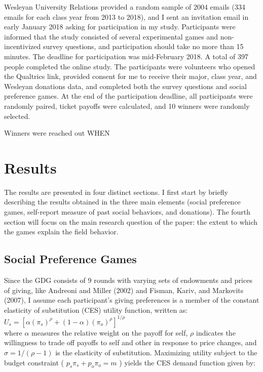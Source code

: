 \documentclass[12pt]{article}
\begin{document}
Wesleyan University Relations provided a random sample of 2004 emails (334 emails for each class year from 2013 to 2018), and I sent an invitation email in early January 2018 asking for participation in my study. Participants were informed that the study consisted of several experimental games and non-incentivized survey questions, and participation should take no more than 15 minutes.  The deadline for participation was mid-February 2018. A total of 397 people completed the online study. The participants were volunteers who opened the Qualtrics link, provided consent for me to receive their major, class year, and Wesleyan donations data, and completed both the survey questions and social preference games. At the end of the participation deadline, all participants were randomly paired, ticket payoffs were calculated, and 10 winners were randomly selected. 

{\color{red} Winners were reached out WHEN}


\section{Results}
The results are presented in four distinct sections. I first start by briefly describing the results obtained in the three main elements (social preference games, self-report measure of past social behaviors, and donations). The fourth section will focus on the main research question of the paper: the extent to which the games explain the field behavior.

\subsection{Social Preference Games}
Since the GDG consists of 9 rounds with varying sets of endowments and prices of giving, like Andreoni and Miller (2002) and Fisman, Kariv, and Markovits (2007), I assume each participant's giving preferences is a member of the constant elasticity of substitution (CES) utility function, written as: \\

\(U_{s} = [\alpha(\pi_{s})^{\rho} + (1-\alpha)(\pi_{o})^{\rho}]^{1/\rho} \) \\

\noindent
where \(\alpha\) measures the relative weight on the payoff for self, \(\rho\) indicates the willingness to trade off payoffs to self and other in response to price changes, and \(\sigma = 1/(\rho - 1) \) is the elasticity of substitution. Maximizing utility subject to the budget constraint ( \(p_{s}\pi_{s} + p_{o}\pi_{o}=m\) ) yields the CES demand function given by: \\
 
\end{document}
